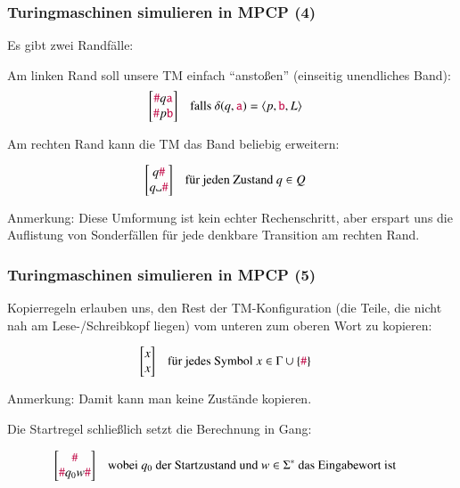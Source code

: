 \documentclass[onlymath]{beamer}
\begin{document}
\begin{frame}\frametitle{Turingmaschinen simulieren in MPCP (4)}

Es gibt zwei \alert{Randfälle:}\bigskip

Am linken Rand soll unsere TM einfach "`anstoßen"' (einseitig unendliches Band):
\begin{align*}
\left[\begin{matrix}\mathtt{\textcolor{purple}{\#}}q\mathtt{\textcolor{purple}{a}}\\\mathtt{\textcolor{purple}{\#}}p\mathtt{\textcolor{purple}{b}}\end{matrix}\right]\quad
	& \text{falls $\delta(q,\mathtt{\textcolor{purple}{a}})=\langle{p,\ensuremath{\mathtt{\textcolor{purple}{b}}},L}\rangle$}
\end{align*}

Am rechten Rand kann die TM das Band beliebig erweitern:

\begin{align*}
\left[\begin{matrix}q\Sterm{\#}\\q\blank\Sterm{\#}\end{matrix}\right]\quad
	& \text{für jeden Zustand $q\in Q$}
\end{align*}

\textcolor{devilscss}{Anmerkung: Diese Umformung ist kein echter Rechenschritt, aber erspart uns die Auflistung von Sonderfällen für jede denkbare Transition am rechten Rand.}

\end{frame}

\begin{frame}\frametitle{Turingmaschinen simulieren in MPCP (5)}

\alert{Kopierregeln} erlauben uns, den Rest der TM-Konfiguration (die Teile, die nicht nah am Lese-/Schreibkopf liegen) vom unteren zum oberen Wort zu kopieren:

\begin{align*}
\left[\begin{matrix}x\\ x\end{matrix}\right]\quad
	& \text{für jedes Symbol $x\in \Gamma\cup\{\mathtt{\textcolor{purple}{\#}}\}$}
\end{align*}

\textcolor{devilscss}{Anmerkung: Damit kann man keine Zustände kopieren.}
\bigskip\pause

Die \alert{Startregel} schließlich setzt die Berechnung in Gang:

\begin{align*}
\left[\begin{matrix}\mathtt{\textcolor{purple}{\#}}\\ \mathtt{\textcolor{purple}{\#}}q_0 w\mathtt{\textcolor{purple}{\#}}\end{matrix}\right]\quad
	& \text{wobei $q_0$ der Startzustand und $w\in\Sigma^*$ das Eingabewort ist}
\end{align*}

\end{frame}
\end{document}
